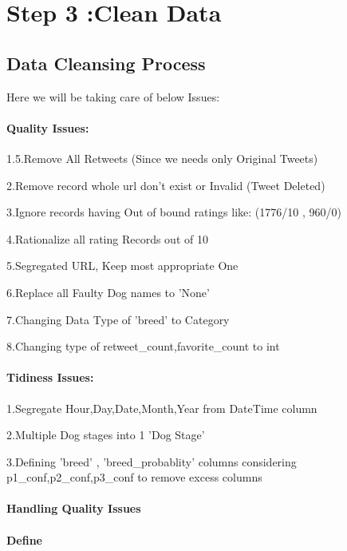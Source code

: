 \documentclass[11pt]{article}
\begin{document}
    \section{Step 3 :Clean Data}\label{step-3-clean-data}

    \subsection{Data Cleansing Process}\label{data-cleansing-process}

Here we will be taking care of below Issues:

\paragraph{Quality Issues:}\label{quality-issues}

1.5.Remove All Retweets (Since we needs only Original Tweets)

2.Remove record whole url don't exist or Invalid (Tweet Deleted)

3.Ignore records having Out of bound ratings like: (1776/10 , 960/0)

4.Rationalize all rating Records out of 10

5.Segregated URL, Keep most appropriate One

6.Replace all Faulty Dog names to 'None'

7.Changing Data Type of 'breed' to Category

8.Changing type of retweet\_count,favorite\_count to int

\paragraph{Tidiness Issues:}\label{tidiness-issues}

1.Segregate Hour,Day,Date,Month,Year from DateTime column

2.Multiple Dog stages into 1 'Dog Stage'

3.Defining 'breed' , 'breed\_probablity' columns considering
p1\_conf,p2\_conf,p3\_conf to remove excess columns

    \paragraph{Handling Quality Issues}\label{handling-quality-issues}

    \paragraph{Define}\label{define}
\end{document}

